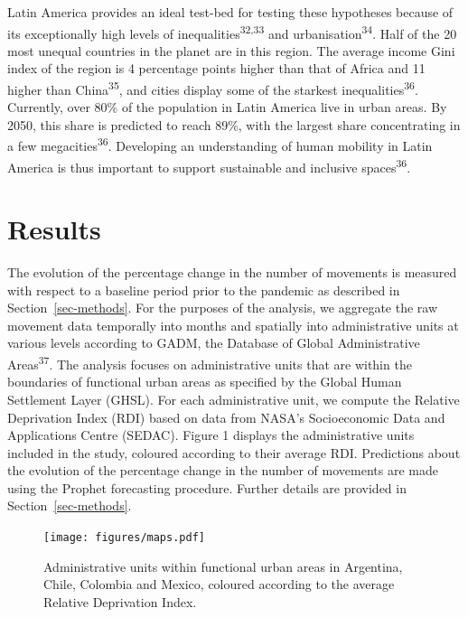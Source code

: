 \documentclass[
  11pt,
]{article}
\begin{document}
Latin America provides an ideal test-bed for testing these hypotheses
because of its exceptionally high levels of
inequalities\textsuperscript{32,33} and
urbanisation\textsuperscript{34}. Half of the 20 most unequal countries
in the planet are in this region. The average income Gini index of the
region is 4 percentage points higher than that of Africa and 11 higher
than China\textsuperscript{35}, and cities display some of the starkest
inequalities\textsuperscript{36}. Currently, over 80\% of the population
in Latin America live in urban areas. By 2050, this share is predicted
to reach 89\%, with the largest share concentrating in a few
megacities\textsuperscript{36}. Developing an understanding of human
mobility in Latin America is thus important to support sustainable and
inclusive spaces\textsuperscript{36}.

\section{Results}\label{sec-results}

The evolution of the percentage change in the number of movements is
measured with respect to a baseline period prior to the pandemic as
described in Section~\ref{sec-methods}. For the purposes of the
analysis, we aggregate the raw movement data temporally into months and
spatially into administrative units at various levels according to GADM,
the Database of Global Administrative Areas\textsuperscript{37}. The
analysis focuses on administrative units that are within the boundaries
of functional urban areas as specified by the Global Human Settlement
Layer (GHSL). For each administrative unit, we compute the Relative
Deprivation Index (RDI) based on data from NASA's Socioeconomic Data and
Applications Centre (SEDAC). Figure 1 displays the administrative units
included in the study, coloured according to their average RDI.
Predictions about the evolution of the percentage change in the number
of movements are made using the Prophet forecasting procedure. Further
details are provided in Section~\ref{sec-methods}.

\begin{figure}[H]

{\centering \texttt{[image: figures/maps.pdf]}

}

\caption{Administrative units within functional urban areas in
Argentina, Chile, Colombia and Mexico, coloured according to the average
Relative Deprivation Index.}

\end{figure}%
\end{document}
